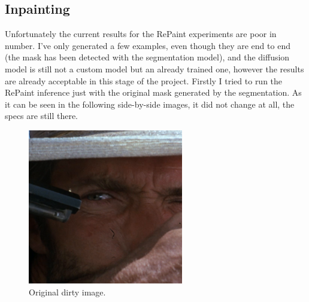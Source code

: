 \documentclass[openany, 12pt]{article}
\begin{document}
\subsection{Inpainting}
Unfortunately the current results for the RePaint experiments are poor in number. I've only generated a few examples, even though they are end to end (the mask has been detected with the segmentation model), and the diffusion model is still not a custom model but an already trained one, however the results are already acceptable in this stage of the project. Firstly I tried to run the RePaint inference just with the original mask generated by the segmentation. As it can be seen in the following side-by-side images, it did not change at all, the specs are still there. 
\begin{figure}[htbp]
	\centering
	\begin{minipage}{0.45\textwidth}
		\centering
		\includegraphics[width=\textwidth]{images/gt_image.png}
		\caption{Original dirty image. }
	\end{minipage}
	\hspace{0.05\textwidth}
	\begin{minipage}{0.45\textwidth}
		\centering

\end{minipage}
\end{figure}
\end{document}

